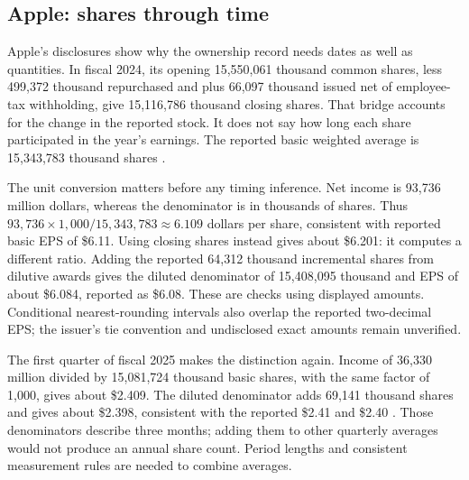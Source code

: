 \subsection{Apple: shares through time}
\label{sec:apple-eps-ownership}

Apple's disclosures show why the ownership record needs dates as well as
quantities. In fiscal 2024, its opening 15,550,061 thousand common shares,
less 499,372 thousand repurchased and plus 66,097 thousand issued net of
employee-tax withholding, give 15,116,786 thousand closing shares. That bridge
accounts for the change in the reported stock. It does not say how long each
share participated in the year's earnings. The reported basic weighted average
is 15,343,783 thousand shares \citep[Notes 3 and 10, printed pp.~36 and 44]{apple2024}.

The unit conversion matters before any timing inference. Net income is
93,736 million dollars, whereas the denominator is in thousands of shares.
Thus $93{,}736\times1{,}000/15{,}343{,}783\approx6.109$ dollars per share,
consistent with reported basic EPS of \$6.11. Using closing shares instead
gives about \$6.201: it computes a different ratio. Adding the reported
64,312 thousand incremental shares from dilutive awards gives the diluted
denominator of 15,408,095 thousand and EPS of about \$6.084, reported as
\$6.08. These are checks using displayed amounts. Conditional nearest-rounding
intervals also overlap the reported two-decimal EPS; the issuer's tie convention
and undisclosed exact amounts remain unverified.

The first quarter of fiscal 2025 makes the distinction again. Income of
36,330 million divided by 15,081,724 thousand basic shares, with the same
factor of 1,000, gives about \$2.409. The diluted denominator adds 69,141
thousand shares and gives about \$2.398, consistent with the reported \$2.41
and \$2.40 \citep[Note 3, printed p.~7]{apple2025q1}. Those denominators describe
three months; adding them to other quarterly averages would not produce an
annual share count. Period lengths and consistent measurement rules are needed
to combine averages.

